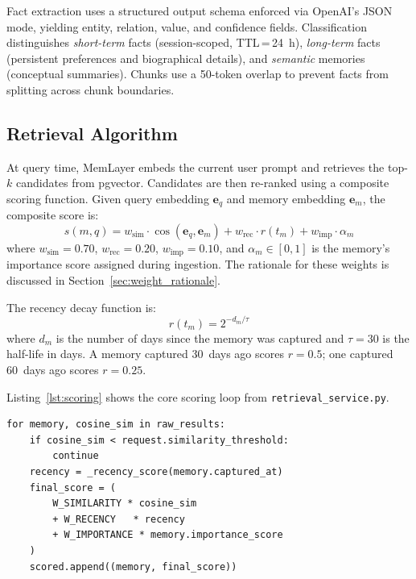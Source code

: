\documentclass[10pt,twocolumn]{article}
\begin{document}
Fact extraction uses a structured output schema enforced via OpenAI's JSON
mode, yielding entity, relation, value, and confidence fields. Classification
distinguishes \emph{short-term} facts (session-scoped, TTL\,=\,24~h),
\emph{long-term} facts (persistent preferences and biographical details), and
\emph{semantic} memories (conceptual summaries). Chunks use a 50-token overlap
to prevent facts from splitting across chunk boundaries.

\subsection{Retrieval Algorithm}

\noindent
At query time, MemLayer embeds the current user prompt and retrieves the
top-$k$ candidates from pgvector. Candidates are then re-ranked using a
composite scoring function. Given query embedding $\mathbf{e}_q$ and memory
embedding $\mathbf{e}_m$, the composite score is:
\begin{equation}
  s(m, q) = w_{\text{sim}} \cdot \cos(\mathbf{e}_q, \mathbf{e}_m)
           + w_{\text{rec}} \cdot r(t_m)
           + w_{\text{imp}} \cdot \alpha_m
  \label{eq:composite}
\end{equation}
where $w_{\text{sim}} = 0.70$, $w_{\text{rec}} = 0.20$, $w_{\text{imp}} = 0.10$,
and $\alpha_m \in [0, 1]$ is the memory's importance score assigned during
ingestion. The rationale for these weights is discussed in
Section~\ref{sec:weight_rationale}.

The recency decay function is:
\begin{equation}
  r(t_m) = 2^{-d_m / \tau}
  \label{eq:decay}
\end{equation}
where $d_m$ is the number of days since the memory was captured and $\tau = 30$
is the half-life in days. A memory captured 30~days ago scores $r = 0.5$; one
captured 60~days ago scores $r = 0.25$.

Listing~\ref{lst:scoring} shows the core scoring loop from
\texttt{retrieval\_service.py}.

\begin{lstlisting}[caption={Composite scoring loop (\texttt{services/retrieval\_service.py}).},label=lst:scoring]
for memory, cosine_sim in raw_results:
    if cosine_sim < request.similarity_threshold:
        continue
    recency = _recency_score(memory.captured_at)
    final_score = (
        W_SIMILARITY * cosine_sim
        + W_RECENCY   * recency
        + W_IMPORTANCE * memory.importance_score
    )
    scored.append((memory, final_score))
\end{lstlisting}
\end{document}
